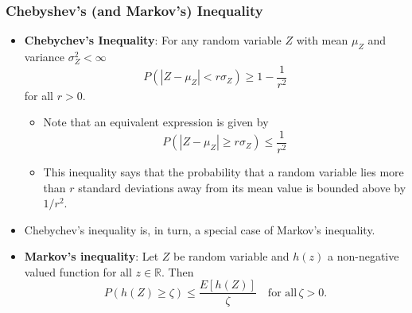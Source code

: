 \documentclass[notes=show,smaller,handout]{beamer}
\renewcommand{\Pr}{P}
\newenvironment{stepitemize}{\begin{itemize}[<+->]}{\end{itemize} }
\begin{document}
\begin{frame}%

\frametitle{Chebyshev's (and Markov's) Inequality}

\begin{stepitemize}
\item \textbf{Chebychev's Inequality}: For any random variable $Z$ with mean $\mu_Z$ and variance $\sigma_Z^2<\infty$
\begin{equation*}
\Pr \left( \left\vert Z-\mu_Z\right\vert <r\sigma_Z\right) \geq 1-\frac{1 }{r^{2}}
\end{equation*}
for all $r>0$.
\begin{stepitemize}
\item Note that an equivalent expression is given by
\begin{equation}
\Pr \left( \left\vert Z-\mu_Z\right\vert \geq r\sigma_Z\right) \leq \frac{1 }{r^{2}} \label{Eq. C2}
\end{equation}
\item This inequality says that the probability that a random variable lies more than $r$ standard deviations away from its mean value is bounded above by $1/r^2$.
\end{stepitemize}
\item Chebychev's inequality is, in turn, a special case of Markov's inequality.
\item \textbf{Markov's inequality}: Let $Z$ be random variable and $h(z)$ a non-negative valued function for all $z\in \mathbb{R}$. Then
\begin{equation}
\Pr(h(Z)\geq \zeta)\leq \frac{E[h(Z)]}{\zeta}\quad\text{for all}\,\zeta>0. \label{Eq. M1}
\end{equation}
\end{stepitemize}

\end{frame}%
\end{document}
